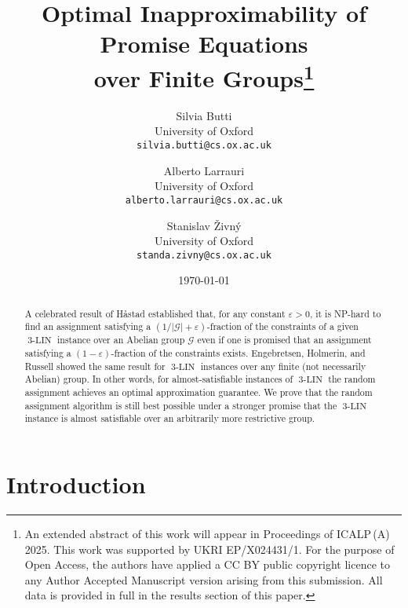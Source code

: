 \documentclass[a4paper,11pt]{article}
\theoremstyle{definition}
\newcommand{\gr}{\mathscr{G}}
\newcommand{\eq}{\ensuremath{\operatorname{3-LIN}}}
\begin{document}
\title{Optimal Inapproximability of Promise Equations\\ over Finite Groups\thanks{An extended abstract of this work will appear in Proceedings of ICALP\,(A) 2025. This work was supported by UKRI EP/X024431/1. For the purpose of Open Access, the authors have applied a CC BY public copyright licence to any Author Accepted Manuscript version arising from this submission. All data is provided in full in the results section of this paper.}}

\author{Silvia Butti\\
University of Oxford\\
\texttt{silvia.butti@cs.ox.ac.uk}
\and
Alberto Larrauri\\
University of Oxford\\
\texttt{alberto.larrauri@cs.ox.ac.uk}
\and
Stanislav \v{Z}ivn\'y\\
University of Oxford\\
\texttt{standa.zivny@cs.ox.ac.uk}
}
\date{\today}



\maketitle

\begin{abstract}

A celebrated result of H{\aa}stad established that, for any constant $\varepsilon>0$,
it is NP-hard to find an assignment satisfying a $(1/|\gr|+\varepsilon)$-fraction
of the constraints of a given $\eq$ instance over an Abelian group $\gr$ even if
one is promised that an assignment satisfying a $(1-\varepsilon)$-fraction of
the constraints exists. Engebretsen, Holmerin, and Russell showed the same
result for $\eq$ instances over any finite (not necessarily Abelian) group.
In other words, for almost-satisfiable instances of $\eq$ the random
assignment achieves an optimal approximation guarantee.
%
We prove that the random assignment algorithm is still best possible under a stronger
promise that the $\eq$ instance is almost satisfiable over an arbitrarily
more restrictive group.

\end{abstract}

\section{Introduction}
\end{document}
